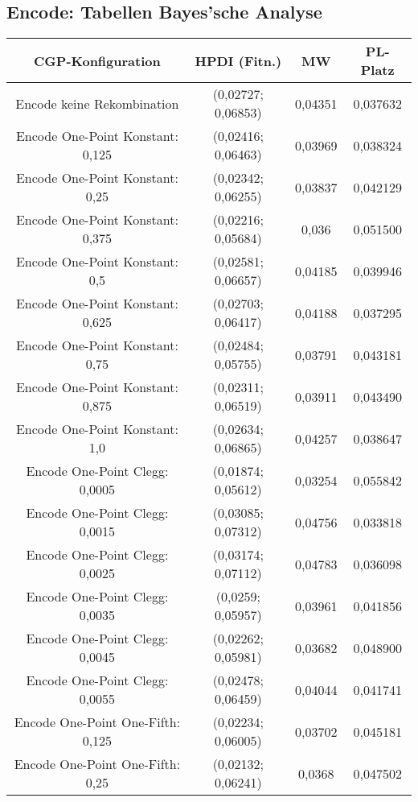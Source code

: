 \subsection{Encode: Tabellen Bayes'sche Analyse}
\label{subsec:appendixTabellesnBayesEncode}
\begin{table}[H]
	\centering
	\begin{tabular}{c | c | c | c}
		\textbf{CGP-Konfiguration} & \textbf{HPDI (Fitn.)} & \textbf{MW} & \textbf{PL-Platz}\\
		\hline
		Encode keine Rekombination & (0,02727; 0,06853) & 0,04351 & 0,037632\\
		\hline
		Encode One-Point Konstant: 0,125 & (0,02416; 0,06463) & 0,03969 & 0,038324\\
		\hline
		Encode One-Point Konstant: 0,25 & (0,02342; 0,06255) & 0,03837 & 0,042129\\
		\hline
		Encode One-Point Konstant: 0,375 & (0,02216; 0,05684) & 0,036 & 0,051500\\
		\hline
		Encode One-Point Konstant: 0,5 & (0,02581; 0,06657) & 0,04185 & 0,039946\\
		\hline
		Encode One-Point Konstant: 0,625 & (0,02703; 0,06417) & 0,04188 & 0,037295\\
		\hline
		Encode One-Point Konstant: 0,75 & (0,02484; 0,05755) & 0,03791 & 0,043181\\
		\hline
		Encode One-Point Konstant: 0,875 & (0,02311; 0,06519) & 0,03911 & 0,043490\\
		\hline
		Encode One-Point Konstant: 1,0 & (0,02634; 0,06865) & 0,04257 & 0,038647\\
		\hline
		Encode One-Point Clegg: 0,0005 & (0,01874; 0,05612) & 0,03254 & 0,055842\\
		\hline
		Encode One-Point Clegg: 0,0015 & (0,03085; 0,07312) & 0,04756 & 0,033818\\
		\hline
		Encode One-Point Clegg: 0,0025 & (0,03174; 0,07112) & 0,04783 & 0,036098\\
		\hline
		Encode One-Point Clegg: 0,0035 & (0,0259; 0,05957) & 0,03961 & 0,041856\\
		\hline
		Encode One-Point Clegg: 0,0045 & (0,02262; 0,05981) & 0,03682 & 0,048900\\
		\hline
		Encode One-Point Clegg: 0,0055 & (0,02478; 0,06459) & 0,04044 & 0,041741\\
		\hline
		Encode One-Point One-Fifth: 0,125 & (0,02234; 0,06005) & 0,03702 & 0,045181\\
		\hline
		Encode One-Point One-Fifth: 0,25 & (0,02132; 0,06241) & 0,0368 & 0,047502\\

\end{tabular}
\end{table}
